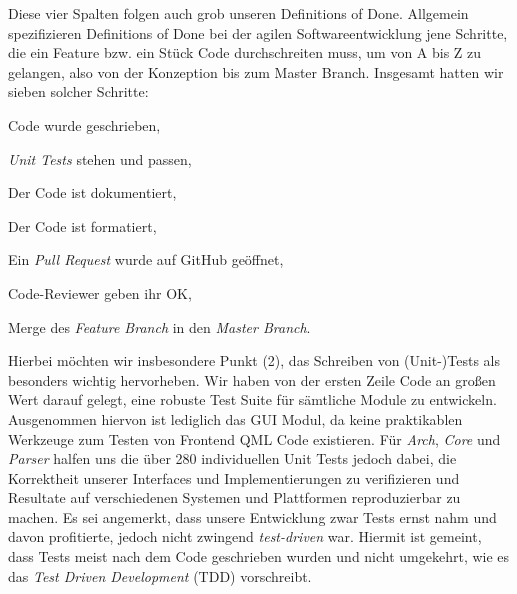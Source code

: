 Diese vier Spalten folgen auch grob unseren Definitions of Done. Allgemein
spezifizieren Definitions of Done bei der agilen Softwareentwicklung jene
Schritte, die ein Feature bzw. ein Stück Code durchschreiten muss, um von A bis
Z zu gelangen, also von der Konzeption bis zum Master Branch. Insgesamt hatten
wir sieben solcher Schritte:
\begin{senumerate}{-0.5cm}
  \item Code wurde geschrieben,
  \item \emph{Unit Tests} stehen und passen,
  \item Der Code ist dokumentiert,
  \item Der Code ist formatiert,
  \item Ein \emph{Pull Request} wurde auf GitHub geöffnet,
  \item Code-Reviewer geben ihr OK,
  \item Merge des \emph{Feature Branch} in den \emph{Master Branch}.
  \vspace{-0.5cm}
\end{senumerate}

Hierbei möchten wir insbesondere Punkt (2), das Schreiben von (Unit-)Tests als
besonders wichtig hervorheben. Wir haben von der ersten Zeile Code an großen
Wert darauf gelegt, eine robuste Test Suite für sämtliche Module zu entwickeln.
Ausgenommen hiervon ist lediglich das GUI Modul, da keine praktikablen Werkzeuge
zum Testen von Frontend QML Code existieren. Für \emph{Arch}, \emph{Core} und
\emph{Parser} halfen uns die über 280 individuellen Unit Tests jedoch dabei, die
Korrektheit unserer Interfaces und Implementierungen zu verifizieren und
Resultate auf verschiedenen Systemen und Plattformen reproduzierbar zu machen.
Es sei angemerkt, dass unsere Entwicklung zwar Tests ernst nahm und davon
profitierte, jedoch nicht zwingend \emph{test-driven} war. Hiermit ist gemeint,
dass Tests meist nach dem Code  geschrieben wurden und nicht umgekehrt, wie es
das \emph{Test Driven Development} (TDD) vorschreibt.
\vspace{-0.7cm}

